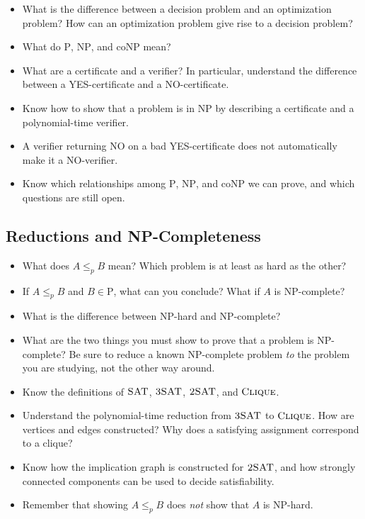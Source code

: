 \documentclass[11 pt]{exam}
\begin{document}
	\begin{itemize}
		\item What is the difference between a decision problem and an optimization problem? How can an optimization problem give rise to a decision problem?
		\item What do $\mathrm{P}$, $\mathrm{NP}$, and $\mathrm{coNP}$ mean?
		\item What are a certificate and a verifier? In particular, understand the difference between a YES-certificate and a NO-certificate.
		\item Know how to show that a problem is in $\mathrm{NP}$ by describing a certificate and a polynomial-time verifier.
		\item A verifier returning NO on a bad YES-certificate does not automatically make it a NO-verifier.
		\item Know which relationships among $\mathrm{P}$, $\mathrm{NP}$, and $\mathrm{coNP}$ we can prove, and which questions are still open.
	\end{itemize}

	\subsection{Reductions and NP-Completeness}

	\begin{itemize}
		\item What does $A\leq_p B$ mean? Which problem is at least as hard as the other?
		\item If $A\leq_p B$ and $B\in\mathrm{P}$, what can you conclude? What if $A$ is $\mathrm{NP}$-complete?
		\item What is the difference between $\mathrm{NP}$-hard and $\mathrm{NP}$-complete?
		\item What are the two things you must show to prove that a problem is $\mathrm{NP}$-complete? Be sure to reduce a known $\mathrm{NP}$-complete problem \emph{to} the problem you are studying, not the other way around.
		\item Know the definitions of $\textsc{SAT}$, $\textsc{3SAT}$, $\textsc{2SAT}$, and $\textsc{Clique}$.
		\item Understand the polynomial-time reduction from $\textsc{3SAT}$ to $\textsc{Clique}$. How are vertices and edges constructed? Why does a satisfying assignment correspond to a clique?
		\item Know how the implication graph is constructed for $\textsc{2SAT}$, and how strongly connected components can be used to decide satisfiability.
		\item Remember that showing $A\leq_p B$ does \emph{not} show that $A$ is $\mathrm{NP}$-hard.
	\end{itemize}
\end{document}
